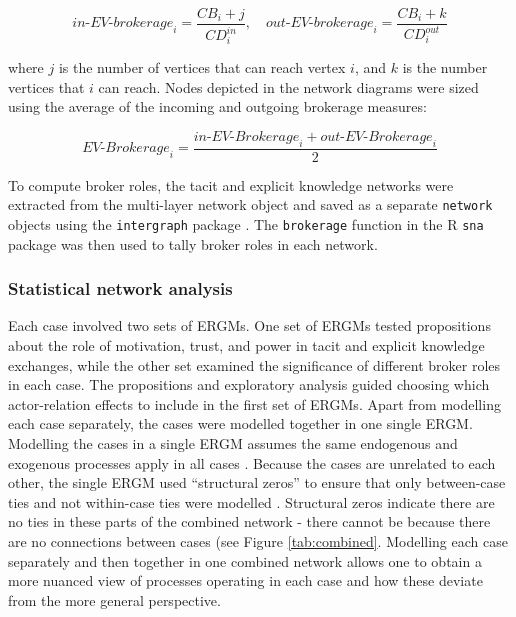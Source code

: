 $$\textit{in-EV-brokerage}_i = \frac{CB_i + j}{CD_i^{in}},  \,\,\,\,\,\, \textit{out-EV-brokerage}_i = \frac{CB_i + k}{CD_i^{out}} $$ \medskip

\noindent where $j$ is the number of vertices that can reach vertex $i$, and $k$ is the number vertices that $i$ can reach. Nodes depicted in the network diagrams were sized using the average of the incoming and outgoing brokerage measures: \medskip

$$ \textit{EV-Brokerage}_i = \frac{\textit{in-EV-Brokerage}_i + \textit{out-EV-Brokerage}_i}{2} $$ \medskip

To compute \citet{gould1989structures} broker roles, the tacit and explicit knowledge networks were extracted from the multi-layer network object and saved as a separate \texttt{network} objects \citep{butts2008network} using the \texttt{intergraph} package \citep{bojanowski2015intergraph}. The \texttt{brokerage} function in the R \texttt{sna} package \citep{butts2016sna} was then used to tally broker roles in each network. 

\subsubsection{Statistical network analysis}

Each case involved two sets of ERGMs. One set of ERGMs tested propositions about the role of motivation, trust, and power in tacit and explicit knowledge exchanges, while the other set examined the significance of different broker roles in each case. The propositions and exploratory analysis guided choosing which actor-relation effects to include in the first set of ERGMs. Apart from modelling each case separately, the cases were modelled together in one single ERGM. Modelling the cases in a single ERGM assumes the same endogenous and exogenous processes apply in all cases \citep{kalish2013brain}. Because the cases are unrelated to each other, the single ERGM used \enquote{structural zeros} to ensure that only between-case ties and not within-case ties were modelled \citep{lusher2012trust}. Structural zeros indicate there are no ties in these parts of the combined network - there cannot be because there are no connections between cases (see Figure \ref{tab:combined}. Modelling each case separately and then together in one combined network allows one to obtain a more nuanced view of processes operating in each case and how these deviate from the more general perspective. \medskip

